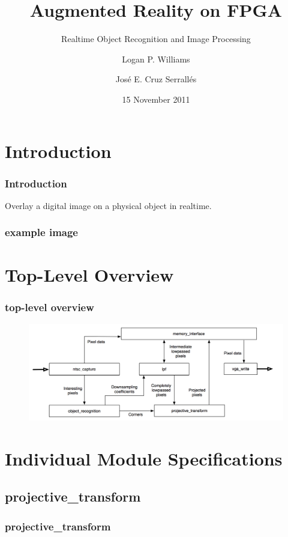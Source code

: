 \documentclass{beamer}
\title[Augmented Reality on FPGA]{Augmented Reality on FPGA}
\subtitle{Realtime Object Recognition and Image Processing}
\author{Logan P. Williams \and Jos\'{e} E. Cruz Serrall\'{e}s}
\date{15 November 2011}
\begin{document}
\begin{frame}
	\titlepage
\end{frame}

\section{Introduction}
\begin{frame}
	\frametitle{Introduction}
	Overlay a digital image on a physical object in realtime.
\end{frame}

\begin{frame}
	\frametitle{example image}
	\begin{figure}
		\centering
	\end{figure}
\end{frame}

\section{Top-Level Overview}
\begin{frame}
	\frametitle{top-level overview}
	\begin{figure}
		\centering
		\includegraphics[width=\textwidth]{../proposal/simplified_block_diagram.png}
	\end{figure}
\end{frame}

\section{Individual Module Specifications}
\subsection{projective\_transform}
\begin{frame}
	\frametitle{projective\_transform}
\end{frame}
\end{document}
